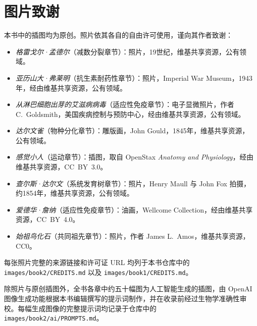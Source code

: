 \chapter*{图片致谢}


\begingroup\sloppy

本书中的插图均为原创。照片依其各自的自由许可使用，谨向其作者致谢：

\begin{itemize}
  \item \emph{格雷戈尔·孟德尔}（减数分裂章节）：照片，19世纪，维基共享资源，公有领域。
  \item \emph{亚历山大·弗莱明}（抗生素耐药性章节）：照片，Imperial War Museum，1943年，经由维基共享资源，公有领域。
  \item \emph{从淋巴细胞出芽的艾滋病病毒}（适应性免疫章节）：电子显微照片，作者 C.~Goldsmith，美国疾病控制与预防中心，经由维基共享资源，公有领域。
  \item \emph{达尔文雀}（物种分化章节）：雕版画，John Gould，1845年，维基共享资源，公有领域。
  \item \emph{感觉小人}（运动章节）：插图，取自 OpenStax \emph{Anatomy and Physiology}，经由维基共享资源，CC~BY~3.0。
  \item \emph{查尔斯·达尔文}（系统发育树章节）：照片，Henry Maull 与 John Fox 拍摄，约1854年，维基共享资源，公有领域。
  \item \emph{爱德华·詹纳}（适应性免疫章节）：油画，Wellcome Collection，经由维基共享资源，CC~BY~4.0。
  \item \emph{始祖鸟化石}（共同祖先章节）：照片，作者 James L.~Amos，维基共享资源，CC0。
\end{itemize}

每张照片完整的来源链接和许可证 URL 均列于本书仓库中的
\texttt{images/\allowbreak book2/\allowbreak CREDITS.md} 以及 \texttt{images/\allowbreak book1/\allowbreak CREDITS.md}。

\bigskip
除照片与原创插图外，全书各章中约五十幅图为人工智能生成的插图，由 OpenAI 图像生成功能根据本书编辑撰写的提示词制作，并在收录前经过生物学准确性审校。每幅生成图像的完整提示词均记录于仓库中的
\texttt{images/\allowbreak book2/\allowbreak ai/\allowbreak PROMPTS.md}。
\par\endgroup
\clearpage
